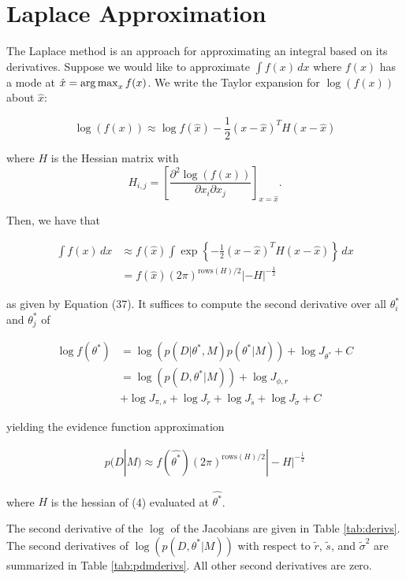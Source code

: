 \section{Laplace Approximation} 
\label{sec: laplace}

The Laplace method is an approach for approximating an integral based on its derivatives.  Suppose we would like to approximate $\int f(x)\, dx$ where $f(x)$ has a mode at $\hat{x} = \operatorname*{arg\,max}_x f(x)$.  We write the Taylor expansion for $\log(f(x))$ about $\hat{x}$:

$$\log(f(x)) \approx \log f(\hat{x}) - \frac{1}{2} (x - \hat{x})^TH(x - \hat{x})$$

where $H$ is the Hessian matrix with $$H_{i,j} = \left[\frac{\partial^2 \log(f(x))}{\partial x_i \partial x_j}\right]_{x = \hat{x}}.$$

Then, we have that 

\begin{align*}
    \int f(x) \, dx &\approx f(\hat{x}) \int \exp\left\{  - \frac{1}{2} (x - \hat{x})^TH(x - \hat{x})\right\}\, dx\\
    &=  f(\hat{x}) (2\pi)^{\text{rows}(H)/2} |-H|^{-\frac{1}{2}}
\end{align*}

as given by \cite{minka2000} Equation (37).  
It suffices to compute the second derivative over all $\theta^*_i$ and $\theta^*_j$ of

\begin{align*}
    \log f(\theta^*) &= \log\left(p(D|\theta^*, M)p(\theta^* | M)\right)  + \log J_{\theta^*} + C\\
    &= \log\left(p(D, \theta^* |  M)\right) +  \log J_{\phi, r} \tag{4}\\
    &+ \log  J_{\pi, s} + \log J_{\tilde{r}}  + \log J_{\tilde{s}} + \log J_{\tilde{\sigma}} + C
\end{align*}

yielding the evidence function approximation

\begin{align*}
    p(D|M) \approx f(\hat{\theta^*}) (2\pi)^{\text{rows}(H)/2} |-H|^{-\frac{1}{2}} \tag{5}
\end{align*}

where $H$ is the hessian of (4) evaluated at $\hat{\theta^*}$.

The second derivative of the $\log$ of the Jacobians are given in Table \ref{tab:derivs}.  The second derivatives of $\log\left(p(D, \theta^* |  M)\right)$ with respect to $\tilde{r}$, $\tilde{s}$, and $\tilde{\sigma}^2$ are summarized in Table \ref{tab:pdmderivs}.  All other second derivatives are zero.
 
